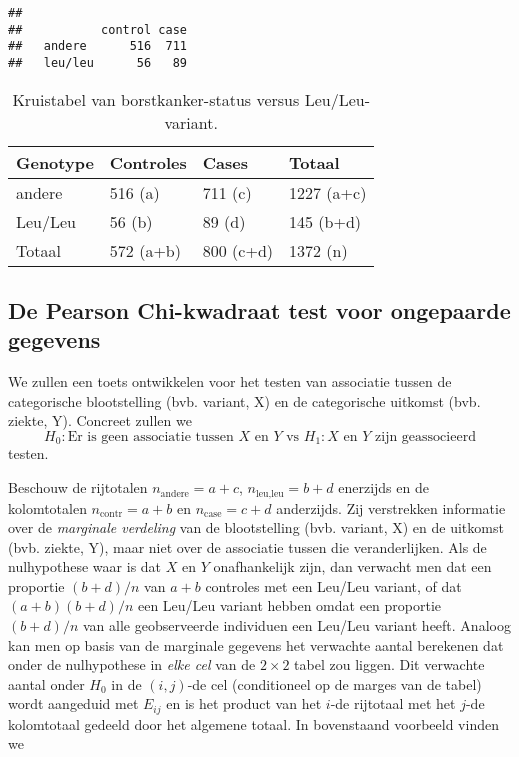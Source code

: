 \documentclass[12pt,dutch,coursenotes]{book}
\theoremstyle{definition}
\theoremstyle{definition}
\theoremstyle{definition}
\theoremstyle{remark}
\begin{document}
\begin{verbatim}
##          
##           control case
##   andere      516  711
##   leu/leu      56   89
\end{verbatim}

\begin{table}[t]

\caption{\label{tab:leu4}Kruistabel van borstkanker-status versus Leu/Leu-variant.}
\centering
\begin{tabular}{llll}
\toprule
Genotype & Controles & Cases & Totaal\\
\midrule
andere & 516 (a) & 711 (c) & 1227 (a+c)\\
Leu/Leu & 56 (b) & 89 (d) & 145 (b+d)\\
Totaal & 572 (a+b) & 800 (c+d) & 1372 (n)\\
\bottomrule
\end{tabular}
\end{table}

\subsection{De Pearson Chi-kwadraat test voor ongepaarde
gegevens}\label{de-pearson-chi-kwadraat-test-voor-ongepaarde-gegevens}

We zullen een toets ontwikkelen voor het testen van associatie tussen de
categorische blootstelling (bvb. variant, X) en de categorische uitkomst
(bvb. ziekte, Y). Concreet zullen we
\[H_0: \text{Er is geen associatie tussen } X \text{ en } Y \text{ vs } H_1: X \text{ en } Y \text{ zijn geassocieerd}\]
testen.

Beschouw de rijtotalen \(n_\text{andere}=a+c\), \(n_\text{leu,leu}=b+d\)
enerzijds en de kolomtotalen \(n_\text{contr}=a+b\) en
\(n_\text{case}=c+d\) anderzijds. Zij verstrekken informatie over de
\emph{marginale verdeling} van de blootstelling (bvb. variant, X) en de
uitkomst (bvb. ziekte, Y), maar niet over de associatie tussen die
veranderlijken. Als de nulhypothese waar is dat \(X\) en \(Y\)
onafhankelijk zijn, dan verwacht men dat een proportie \((b+d)/n\) van
\(a+b\) controles met een Leu/Leu variant, of dat \((a+b)(b+d)/n\) een
Leu/Leu variant hebben omdat een proportie \((b+d)/n\) van alle
geobserveerde individuen een Leu/Leu variant heeft. Analoog kan men op
basis van de marginale gegevens het verwachte aantal berekenen dat onder
de nulhypothese in \emph{elke cel} van de \(2\times 2\) tabel zou
liggen. Dit verwachte aantal onder \(H_0\) in de \((i,j)\)-de cel
(conditioneel op de marges van de tabel) wordt aangeduid met \(E_{ij}\)
en is het product van het \(i\)-de rijtotaal met het \(j\)-de
kolomtotaal gedeeld door het algemene totaal. In bovenstaand voorbeeld
vinden we
\end{document}
